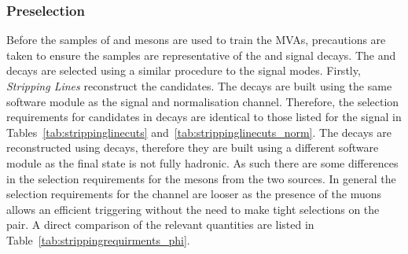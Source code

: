 \subsubsection{Preselection}

Before the samples of \Dsp and \phiz mesons are used to train the MVAs, precautions are taken to ensure the samples are representative of the \decay{\Bp}{\Dsp\phiz} and \decay{\Bp}{\Dsp\Kp\Km} signal decays. The \decay{\Bsb}{\Dsp\pim} and \decay{\Bs}{\jpsi\phiz} decays are selected using a similar procedure to the signal modes. Firstly, \emph{Stripping Lines} reconstruct the candidates. The \decay{\Bsb}{\Dsp\pim} decays are built using the same software module as the signal and normalisation channel. Therefore, the selection requirements for \Dsp candidates in \decay{\Bsb}{\Dsp\pim} decays are identical to those listed for the signal in Tables~\ref{tab:strippinglinecuts} and~\ref{tab:strippinglinecuts_norm}.
The \decay{\Bs}{\jpsi\phiz} decays are reconstructed using \decay{\jpsi}{\mup\mun} decays, therefore they are built using a different software module as the final state is not fully hadronic. As such there are some differences in the selection requirements for the \phiz mesons from the two sources. In general the selection requirements for the \decay{\Bs}{\jpsi\phiz} channel are looser as the presence of the muons allows an efficient triggering without the need to make tight selections on the \Kp\Km pair. A direct comparison of the relevant quantities are listed in Table~\ref{tab:strippingrequirments_phi}.


